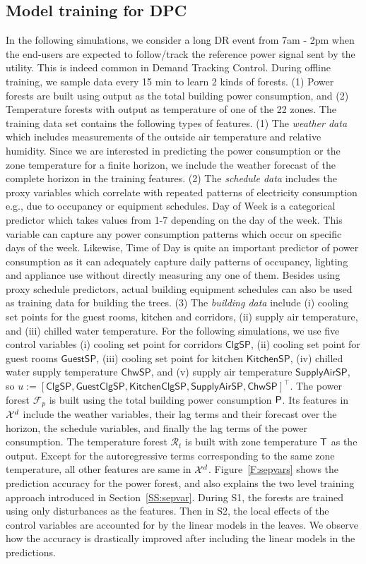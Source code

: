 \subsection{Model training for DPC}

In the following simulations, we consider a long DR event from 7am - 2pm when the end-users are expected to follow/track the reference power signal sent by the utility. This is indeed common in Demand Tracking Control. 
During offline training, we sample data every 15 min to learn 2 kinds of forests. (1) Power forests are built using output as the total building power consumption, and (2) Temperature forests with output as temperature of one of the 22 zones. 
The training data set contains the following types of features. (1) The \textit{weather data} which includes measurements of the outside air temperature and relative humidity. Since we are interested in predicting the power consumption or the zone temperature for a finite horizon, we include the weather forecast of the complete horizon in the training features. (2) The \textit{schedule data} includes the proxy variables which correlate with repeated patterns of electricity consumption e.g., due to occupancy or equipment schedules. Day of Week is a categorical predictor which takes values from 1-7 depending on the day of the week. This variable can capture any power consumption patterns which occur on specific days of the week. Likewise, Time of Day is quite an important predictor of power consumption as it can adequately capture daily patterns of occupancy, lighting and appliance use without directly measuring any one of them. Besides using proxy schedule predictors, actual building equipment schedules can also be used as training data for building the trees. (3) The \textit{building data} include (i) cooling set points for  the guest rooms, kitchen and corridors, (ii) supply air temperature, and (iii) chilled water temperature.
For the following simulations, we use five control variables (i) cooling set point for corridors $\mathsf{ClgSP}$, (ii) cooling set point for guest rooms $\mathsf{GuestSP}$, (iii) cooling set point for kitchen $\mathsf{KitchenSP}$, (iv) chilled water supply temperature $\mathsf{ChwSP}$, and (v) supply air temperature  $\mathsf{SupplyAirSP}$, so $u := [\mathsf{ClgSP},\mathsf{GuestClgSP},\mathsf{KitchenClgSP},\mathsf{SupplyAirSP}, \mathsf{ChwSP}]^\top$. 
The power forest $\mathcal{F}_p$ is built using the total building power consumption $\mathsf{P}$. Its features in $\mathcal{X}^d$ include the weather variables, their lag terms and their forecast over the horizon, the schedule variables, and finally the lag terms of the power consumption.
The temperature forest $\mathcal{R}_t$ is built with zone temperature $\mathsf{T}$ as the output. Except for the autoregressive terms corresponding to the same zone temperature, all other features are same in $\mathcal{X}^d$.
Figure~\ref{F:sepvars} shows the prediction accuracy for the power forest, and also explains the two level training approach introduced in Section~\ref{SS:sepvar}. During S1, the forests are trained using only disturbances as the features. Then in S2, the local effects of the control variables are accounted for by the linear models in the leaves. We observe how the accuracy is drastically improved after including the linear models in the predictions.

